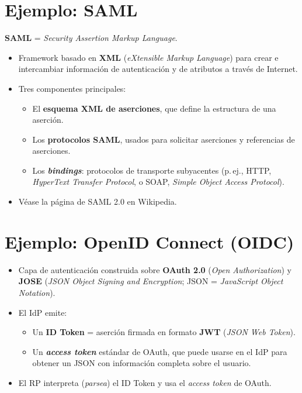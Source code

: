 \documentclass[11pt,a4paper]{report}
\begin{document}
\section{Ejemplo: SAML}
 
\textbf{SAML} = \emph{Security Assertion Markup Language}.
 
\begin{itemize}
  \item Framework basado en \textbf{XML} (\emph{eXtensible Markup Language}) para crear e intercambiar información de autenticación y de atributos a través de Internet.
  \item Tres componentes principales:
    \begin{itemize}
      \item El \textbf{esquema XML de aserciones}, que define la estructura de una aserción.
      \item Los \textbf{protocolos SAML}, usados para solicitar aserciones y referencias de aserciones.
      \item Los \textbf{\emph{bindings}}: protocolos de transporte subyacentes (p.\,ej., HTTP, \emph{HyperText Transfer Protocol}, o SOAP, \emph{Simple Object Access Protocol}).
    \end{itemize}
  \item Véase la página de SAML 2.0 en Wikipedia.
\end{itemize}
 
\section{Ejemplo: OpenID Connect (OIDC)}
 
\begin{itemize}
  \item Capa de autenticación construida sobre \textbf{OAuth 2.0} (\emph{Open Authorization}) y \textbf{JOSE} (\emph{JSON Object Signing and Encryption}; JSON = \emph{JavaScript Object Notation}).
  \item El IdP emite:
    \begin{itemize}
      \item Un \textbf{ID Token} = aserción firmada en formato \textbf{JWT} (\emph{JSON Web Token}).
      \item Un \textbf{\emph{access token}} estándar de OAuth, que puede usarse en el IdP para obtener un JSON con información completa sobre el usuario.
    \end{itemize}
  \item El RP interpreta (\emph{parsea}) el ID Token y usa el \emph{access token} de OAuth.
\end{itemize}
 
\end{document}
